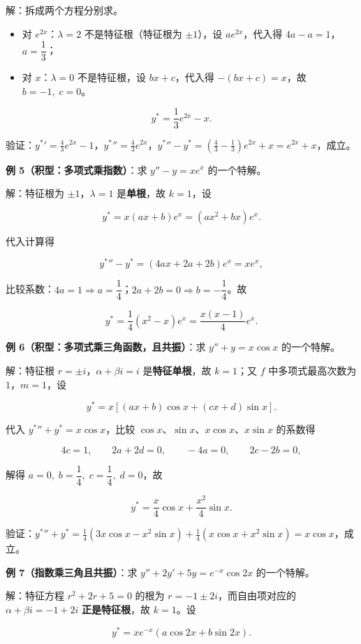 \documentclass[11pt,openany,UTF8]{ctexbook}
\begin{document}
解：拆成两个方程分别求。

\begin{itemize}
\item 对 $e^{2x}$：$\lambda=2$ 不是特征根（特征根为 $\pm1$），设 $ae^{2x}$，代入得 $4a-a=1$，$a=\dfrac13$；
\item 对 $x$：$\lambda=0$ 不是特征根，设 $bx+c$，代入得 $-(bx+c)=x$，故 $b=-1,\;c=0$。
\end{itemize}
\[y^{*}=\frac13e^{2x}-x .\]

验证：${y^{*}}'=\frac43e^{2x}-1$，${y^{*}}''=\frac43e^{2x}$，${y^{*}}''-y^{*}=\left(\frac43-\frac13\right)e^{2x}+x=e^{2x}+x$，成立。

\textbf{例 5（积型：多项式乘指数）}：求 $y''-y=xe^{x}$ 的一个特解。

解：特征根为 $\pm1$，$\lambda=1$ 是\textbf{单根}，故 $k=1$，设

\[y^{*}=x(ax+b)e^{x}=(ax^{2}+bx)e^{x}.\]

代入计算得

\[{y^{*}}''-y^{*}=\left(4ax+2a+2b\right)e^{x}=xe^{x},\]

比较系数：$4a=1\Rightarrow a=\dfrac14$；$2a+2b=0\Rightarrow b=-\dfrac14$。故

\[y^{*}=\frac14\left(x^{2}-x\right)e^{x}=\frac{x(x-1)}{4}e^{x}.\]

\textbf{例 6（积型：多项式乘三角函数，且共振）}：求 $y''+y=x\cos x$ 的一个特解。

解：特征根 $r=\pm i$，$\alpha+\beta i=i$ 是\textbf{特征单根}，故 $k=1$；又 $f$ 中多项式最高次数为 $1$，$m=1$，设

\[y^{*}=x\left[(ax+b)\cos x+(cx+d)\sin x\right].\]

代入 ${y^{*}}''+y^{*}=x\cos x$，比较 $\cos x$、$\sin x$、$x\cos x$、$x\sin x$ 的系数得

\[4c=1,\qquad 2a+2d=0,\qquad -4a=0,\qquad 2c-2b=0,\]

解得 $a=0,\;b=\dfrac14,\;c=\dfrac14,\;d=0$，故

\[y^{*}=\frac{x}{4}\cos x+\frac{x^{2}}{4}\sin x .\]

验证：${y^{*}}''+y^{*}=\frac14\left(3x\cos x-x^{2}\sin x\right)+\frac14\left(x\cos x+x^{2}\sin x\right)=x\cos x$，成立。

\textbf{例 7（指数乘三角且共振）}：求 $y''+2y'+5y=e^{-x}\cos 2x$ 的一个特解。

解：特征方程 $r^{2}+2r+5=0$ 的根为 $r=-1\pm 2i$，而自由项对应的 $\alpha+\beta i=-1+2i$ \textbf{正是特征根}，故 $k=1$。设

\[y^{*}=xe^{-x}\left(a\cos 2x+b\sin 2x\right).\]
\end{document}
